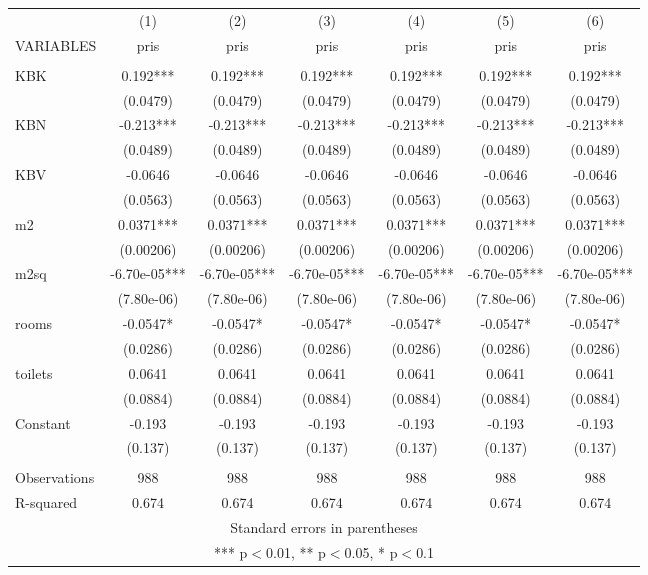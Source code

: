 \documentclass[]{article}
\begin{document}
\begin{tabular}{lcccccc} \hline
 & (1) & (2) & (3) & (4) & (5) & (6) \\
VARIABLES & pris & pris & pris & pris & pris & pris \\ \hline
 &  &  &  &  &  &  \\
KBK & 0.192*** & 0.192*** & 0.192*** & 0.192*** & 0.192*** & 0.192*** \\
 & (0.0479) & (0.0479) & (0.0479) & (0.0479) & (0.0479) & (0.0479) \\
KBN & -0.213*** & -0.213*** & -0.213*** & -0.213*** & -0.213*** & -0.213*** \\
 & (0.0489) & (0.0489) & (0.0489) & (0.0489) & (0.0489) & (0.0489) \\
KBV & -0.0646 & -0.0646 & -0.0646 & -0.0646 & -0.0646 & -0.0646 \\
 & (0.0563) & (0.0563) & (0.0563) & (0.0563) & (0.0563) & (0.0563) \\
m2 & 0.0371*** & 0.0371*** & 0.0371*** & 0.0371*** & 0.0371*** & 0.0371*** \\
 & (0.00206) & (0.00206) & (0.00206) & (0.00206) & (0.00206) & (0.00206) \\
m2sq & -6.70e-05*** & -6.70e-05*** & -6.70e-05*** & -6.70e-05*** & -6.70e-05*** & -6.70e-05*** \\
 & (7.80e-06) & (7.80e-06) & (7.80e-06) & (7.80e-06) & (7.80e-06) & (7.80e-06) \\
rooms & -0.0547* & -0.0547* & -0.0547* & -0.0547* & -0.0547* & -0.0547* \\
 & (0.0286) & (0.0286) & (0.0286) & (0.0286) & (0.0286) & (0.0286) \\
toilets & 0.0641 & 0.0641 & 0.0641 & 0.0641 & 0.0641 & 0.0641 \\
 & (0.0884) & (0.0884) & (0.0884) & (0.0884) & (0.0884) & (0.0884) \\
Constant & -0.193 & -0.193 & -0.193 & -0.193 & -0.193 & -0.193 \\
 & (0.137) & (0.137) & (0.137) & (0.137) & (0.137) & (0.137) \\
 &  &  &  &  &  &  \\
Observations & 988 & 988 & 988 & 988 & 988 & 988 \\
 R-squared & 0.674 & 0.674 & 0.674 & 0.674 & 0.674 & 0.674 \\ \hline
\multicolumn{7}{c}{ Standard errors in parentheses} \\
\multicolumn{7}{c}{ *** p$<$0.01, ** p$<$0.05, * p$<$0.1} \\
\end{tabular}
\end{document}
